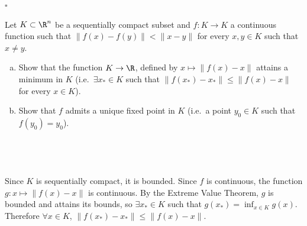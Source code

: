 \documentclass[a4paper]{article}
\begin{document}
\hfill $\square$



\begin{questionbody}
Let $K \subset \R^n$ be a sequentially compact subset and $f : K \to K$ a continuous function such that $\| f(x) - f(y) \| < \| x - y \|$ for every $x, y \in K$ such that $x \ne y$.
\begin{enumerate}[(a)]
\item Show that the function $K \to \R$, defined by $x \mapsto \| f(x) - x \|$ attains a minimum in $K$ (i.e.\ $\exists x_* \in K$ such that $\| f(x_*) - x_* \| \le \| f(x) - x \|$ for every $x \in K$).

\item Show that $f$ admits a unique fixed point in $K$ (i.e.\ a point $y_0 \in K$ such that $f(y_0) = y_0$).


\end{enumerate}
\end{questionbody}


\subsection{~} %


Since $K$ is sequentially compact, it is bounded. Since $f$ is continuous, the function ${g : x \mapsto \| f(x) - x \|}$ is continuous. By the Extreme Value Theorem, $g$ is bounded and attains its bounds, so $\exists x_* \in K$ such that $g(x_*) = \inf_{x \in K} g(x)$. Therefore $\forall x \in K$, $\| f(x_*) - x_* \| \le \| f(x) - x \|$.
\end{document}
